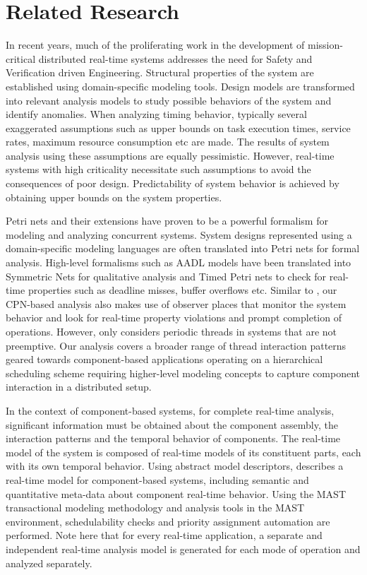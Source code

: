 \vspace{-0.15in}

\section{Related Research}\label{sec:Related_Research}

\vspace{-0.1in}

In recent years, much of the proliferating work in the development of mission-critical distributed real-time systems addresses the need for Safety and Verification driven Engineering. Structural properties of the system are established using domain-specific modeling tools. Design models are transformed into relevant analysis models to study possible behaviors of the system and identify anomalies. When analyzing timing behavior, typically several exaggerated assumptions such as upper bounds on task execution times, service rates, maximum resource consumption etc are made. The results of system analysis using these assumptions are equally pessimistic. However, real-time systems with high criticality necessitate such assumptions to avoid the consequences of poor design. Predictability of system behavior is achieved by obtaining upper bounds on the system properties.   

Petri nets and their extensions have proven to be a powerful formalism for modeling and analyzing concurrent systems. System designs represented using a domain-specific modeling languages are often translated into Petri nets for formal analysis. High-level formalisms such as AADL models have been translated into Symmetric Nets for qualitative analysis \cite{kordon_sn} and Timed Petri nets \cite{kordon2009} to check for real-time properties such as deadline misses, buffer overflows etc. Similar to \cite{kordon2009}, our CPN-based analysis also makes use of observer places \cite{Alpern1989} that monitor the system behavior and look for real-time property violations and prompt completion of operations. However, \cite{kordon2009} only considers periodic threads in systems that are not preemptive. Our analysis covers a broader range of thread interaction patterns geared towards component-based applications operating on a hierarchical scheduling scheme requiring higher-level modeling concepts to capture component interaction in a distributed setup. 

In the context of component-based systems, for complete real-time analysis, significant information must be obtained about the component assembly, the interaction patterns and the temporal behavior of components. The real-time model of the system is composed of real-time models of its constituent parts, each with its own temporal behavior. Using abstract model descriptors, \cite{Lopez2006} describes a real-time model for component-based systems, including semantic and quantitative meta-data about component real-time behavior. Using the MAST transactional modeling methodology \cite{MAST1} and analysis tools in the MAST environment, schedulability checks and priority assignment automation are performed. Note here that for every real-time application, a separate and independent real-time analysis model is generated for each mode of operation and analyzed separately.

